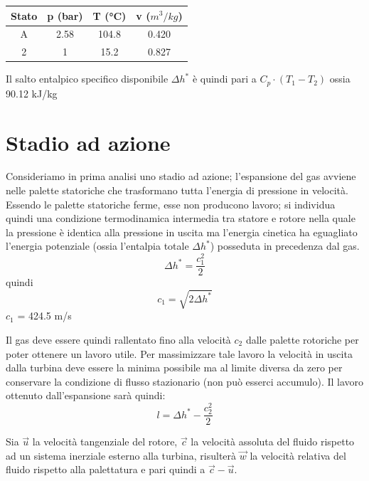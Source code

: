 \documentclass[a4paper,12pt]{article}
\begin{document}
\begin{center}
    \begin{tabular}{c|c|c|c}
        Stato   &p (bar)    &T (°C) &v ($m^3/kg$) \\ \hline
        A       &2.58       &104.8  &0.420  \\
        2       &1          &15.2   &0.827  
    \end{tabular}
\end{center}
Il salto entalpico specifico disponibile $\Delta h^*$ è quindi pari a $C_p \cdot (T_1-T_2)$ ossia 90.12 kJ/kg

\section{Stadio ad azione}
\label{sec:stadio_ad_azione}
Consideriamo in prima analisi uno stadio ad azione; l'espansione del gas avviene nelle palette statoriche che trasformano tutta l'energia di pressione in velocità.
Essendo le palette statoriche ferme, esse non producono lavoro; si individua quindi una condizione termodinamica intermedia tra statore e rotore nella quale
la pressione è identica alla pressione in uscita ma l'energia cinetica ha eguagliato l'energia potenziale
(ossia l'entalpia totale $\Delta h^*$) posseduta in precedenza dal gas.
\begin{equation}
    \label{eq:entalpia_stadio_azione}
    \Delta h^* = \frac{c_1^2}{2}
\end{equation}
quindi
\begin{equation}
    \label{eq:vel_stadio_azione}
    c_1 = \sqrt{2\Delta h^*}    
\end{equation}
$c_1$ = 424.5 m/s

Il gas deve essere quindi rallentato fino alla velocità $c_2$ dalle palette rotoriche per poter ottenere un lavoro utile. Per massimizzare tale lavoro la velocità
in uscita dalla turbina deve essere la minima possibile ma al limite diversa da zero per conservare la condizione di flusso stazionario (non può esserci accumulo).
Il lavoro ottenuto dall'espansione sarà quindi:
\begin{equation}
    \label{eq:lavoro_ad_azione}
    l = \Delta h^* - \frac{c_2^2}{2}
\end{equation}

Sia $\vec u$ la velocità tangenziale del rotore, $\vec c$ la velocità assoluta del fluido rispetto ad un sistema inerziale esterno alla turbina,
risulterà $\vec w$ la velocità relativa del fluido rispetto alla palettatura e pari quindi a  $\vec c - \vec u$.
\end{document}
